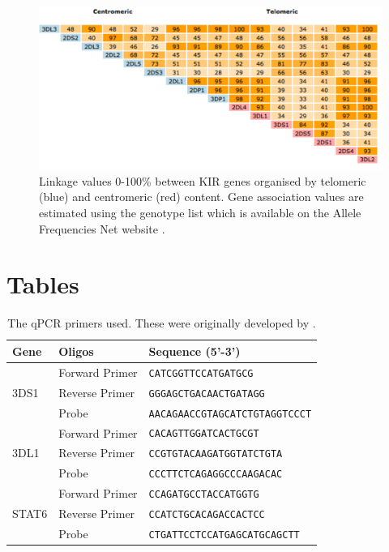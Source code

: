 \documentclass[12pt,a4paper,twoside]{article}
\begin{document}
\begin{figure}[h]
    \centering
    \includegraphics[scale=.75] {figures/LD.pdf}
    \caption{
        Linkage values 0-100\% between KIR genes organised by telomeric (blue) and centromeric (red) content.
        Gene association values are estimated using the genotype list which is available on the Allele Frequencies Net website \citep{GonzalezGalarza:2011gm}.
    }
    \label{figure:LD}
\end{figure}




\section{Tables}



\begin{table}[h]
\begin{center}
\footnotesize
\begin{tabular}{lll}
    \toprule
    Gene & Oligos & Sequence (5'-3') \\
\midrule
    & Forward Primer & \texttt{CATCGGTTCCATGATGCG} \\
    3DS1 & Reverse Primer & \texttt{GGGAGCTGACAACTGATAGG} \\
    & Probe & \texttt{AACAGAACCGTAGCATCTGTAGGTCCCT} \\
\midrule
    & Forward Primer & \texttt{CACAGTTGGATCACTGCGT} \\
    3DL1 & Reverse Primer & \texttt{CCGTGTACAAGATGGTATCTGTA} \\
    & Probe & \texttt{CCCTTCTCAGAGGCCCAAGACAC} \\
\midrule
    & Forward Primer & \texttt{CCAGATGCCTACCATGGTG} \\
    STAT6 & Reverse Primer & \texttt{CCATCTGCACAGACCACTCC} \\
          & Probe & \texttt{CTGATTCCTCCATGAGCATGCAGCTT} \\
\end{tabular}
\end{center}
    \caption{
        The qPCR primers used. These were originally developed by \citet{Jiang:2012cf}.
    }
    \label{table:qPCR-primers}
\end{table}
\end{document}
